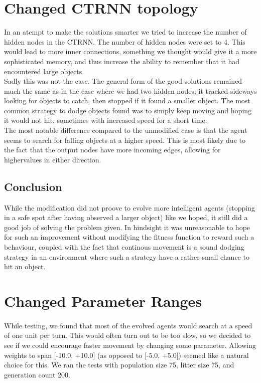 \documentclass[a4paper,12pt]{article}
\begin{document}
\section{Changed CTRNN topology}
In an atempt to make the solutions smarter we tried to increase the number of hidden nodes in the CTRNN. The number of hidden nodes were set to 4. This would lead to more inner connections, something we thought would give it a more sophisticated memory, and thus increase the ability to remember that it had encountered large objects. \\
Sadly this was not the case. The general form of the good solutions remained much the same as in the case where we had two hidden nodes; it tracked sideways looking for objects to catch, then stopped if it found a smaller object. The most common strategy to dodge objects found was to simply keep moving and hoping it would not hit, sometimes with increased speed for a short time. \\
The most notable difference compared to the unmodified case is that the agent seems to search for falling objects at a higher speed. This is most likely due to the fact that the output nodes have more incoming edges, allowing for highervalues in either direction.
\subsection{Conclusion}
While the modification did not proove to evolve more intelligent agents (stopping in a safe spot after having observed a larger object) like we hoped, it still did a good job of solving the problem given. In hindsight it was unreasonable to hope for such an improvement without modifying the fitness function to reward such a behaviour, coupled with the fact that continous movement is a sound dodging strategy in an environment where such a strategy have a rather small chance to hit an object.

\section{Changed Parameter Ranges}
\paragraph{}While testing, we found that most of the evolved agents would search at a speed of one unit per turn. This would often turn out to be too slow, so we decided to see if we could encourage faster movement by changing some parameter. Allowing weights to span [-10.0, +10.0] (as opposed to [-5.0, +5.0]) seemed like a natural choice for this. We ran the tests with population size 75, litter size 75, and generation count 200.
\end{document}
